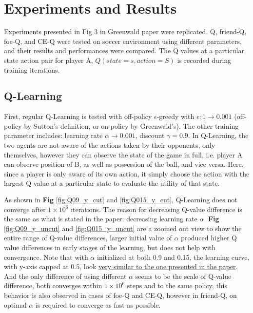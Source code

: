 \documentclass[10pt]{article}
\begin{document}
\section{Experiments and Results} \label{experiments}
Experiments presented in Fig 3 in Greenwald paper\cite{GreenwaldCorrelatedQLearning2003} were replicated. Q, friend-Q, foe-Q, and CE-Q were tested on soccer environment using different parameters, and their results and performances were compared. The Q values at a particular state action pair for player A, $Q(state=s, action=S)$ is recorded during training iterations.
\par




\subsection{Q-Learning} \label{Q}
First, regular Q-Learning is tested with off-policy $\epsilon$-greedy with $\epsilon:1\rightarrow 0.001$ (off-policy by Sutton's definition\cite{SuttonReinforcementLearningIntroduction1998}, or on-policy by Greenwald's\cite{GreenwaldCorrelatedQLearning2005}). The other training parameter includes: learning rate $\alpha\rightarrow 0.001$, discount $\gamma=0.9$. In Q-Learning, the two agents are not aware of the actions taken by their opponents, only themselves, however they can observe the state of the game in full, i.e. player A can observe position of B, as well as possession of the ball, and vice versa. Here, since a player is only aware of its own action, it simply choose the action with the largest Q value at a particular state to evaluate the utility of that state.\par

As shown in \textbf{Fig} \ref{fig:Q09_y_cut} and \ref{fig:Q015_y_cut}, Q-Learning does not converge after $1\times10^6$ iterations. The reason for decreasing Q-value difference is the same as what is stated in the paper: decreasing learning rate $\alpha$. \textbf{Fig} \ref{fig:Q09_y_uncut} and \ref{fig:Q015_y_uncut} are a zoomed out view to show the entire range of Q-value differences, larger initial value of $\alpha$ produced higher Q value differences in early stages of the learning, but does not help with convergence. Note that with $\alpha$ initialized at both 0.9 and 0.15, the learning curve, with y-axis capped at 0.5, look \ul{very similar to the one presented in the paper}\cite{GreenwaldCorrelatedQLearning2003}. And the only difference of using different $\alpha$ seems to be the scale of Q-value difference, both converges within $1\times10^6$ steps and to the same policy, this behavior is also observed in cases of foe-Q and CE-Q, however in friend-Q, on optimal $\alpha$ is required to converge as fast as possible.\par
\end{document}
